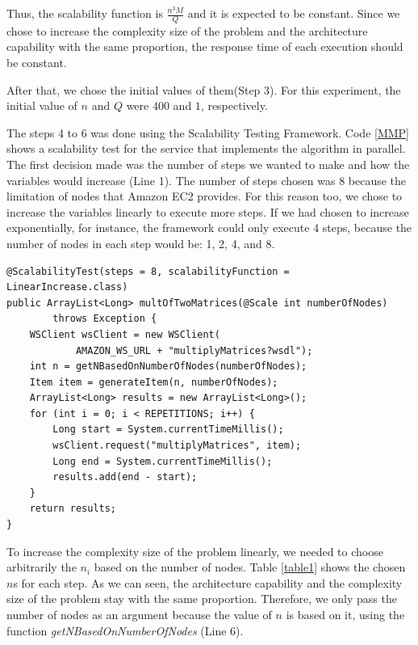 Thus, the scalability function is $\frac{n^3M}{Q}$ and it is expected to be constant. Since we chose to increase the complexity size of the problem and the architecture capability with the same proportion, the response time of each execution should be constant. 

After that, we chose the initial values of them(Step 3). For this experiment, the initial value of $n$ and $Q$ were $400$ and $1$, respectively. 

The steps 4 to 6 was done using the Scalability Testing Framework. Code \ref{MMP} shows a scalability test for the service that implements the algorithm in parallel. The first decision made was the number of steps we wanted to make and how the variables would increase (Line 1). The number of steps chosen was 8  because the limitation of nodes that Amazon EC2 provides. For this reason too, we chose to increase the variables linearly to execute more steps. If we had chosen to increase exponentially, for instance, the framework could only execute 4 steps, because the number of nodes in each step would be: 1, 2, 4, and 8.

\begin{lstlisting}
@ScalabilityTest(steps = 8, scalabilityFunction = LinearIncrease.class)
public ArrayList<Long> multOfTwoMatrices(@Scale int numberOfNodes) 
		throws Exception {
	WSClient wsClient = new WSClient(
			AMAZON_WS_URL + "multiplyMatrices?wsdl");
	int n = getNBasedOnNumberOfNodes(numberOfNodes);
	Item item = generateItem(n, numberOfNodes);
	ArrayList<Long> results = new ArrayList<Long>();
	for (int i = 0; i < REPETITIONS; i++) {
		Long start = System.currentTimeMillis();
		wsClient.request("multiplyMatrices", item);
		Long end = System.currentTimeMillis();
		results.add(end - start);			
	}
	return results;
}
\end{lstlisting}

To increase the complexity size of the problem linearly, we needed to choose arbitrarily the $n_i$ based on the number of nodes. Table \ref{table1} shows the chosen $n$s for each step. As we can seen, the architecture capability and the complexity size of the problem stay with the same proportion. Therefore, we only pass the number of nodes as an argument because the value of $n$ is based on it, using the function \emph{getNBasedOnNumberOfNodes} (Line 6).

